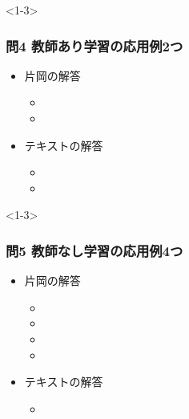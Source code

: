 \documentclass[aspectratio=169, dvipdfmx, 14pt, xcolor={svgnames,dvipsnames}]{beamer}
\def\tightlist{\itemsep1pt\parskip0pt\parsep0pt}
\begin{document}

\begin{frame}<1-3>
  \frametitle{問4 教師あり学習の応用例2つ}


  \begin{itemize}
    \tightlist
    \item
          片岡の解答

          \begin{itemize}
            \tightlist
            \item
            \item
          \end{itemize}
    \item
          テキストの解答

          \begin{itemize}
            \tightlist
            \item
            \item
          \end{itemize}
  \end{itemize}
\end{frame}


\begin{frame}<1-3>
  \frametitle{問5 教師なし学習の応用例4つ}
  \begin{itemize}
    \tightlist
    \item
          片岡の解答

          \begin{itemize}
            \tightlist
            \item
            \item
            \item
            \item
          \end{itemize}
    \item
          テキストの解答

          \begin{itemize}
            \tightlist
            \item
          \end{itemize}
  \end{itemize}
\end{frame}
\end{document}
